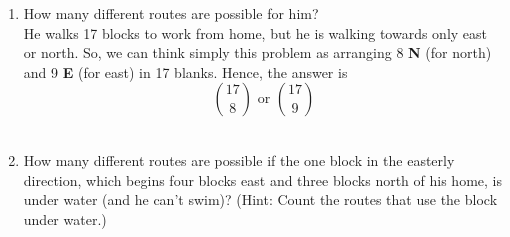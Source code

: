 \documentclass[12pt]{article}
\begin{document}
\begin{itemize}
\begin{center}
    \end{center}
    
    \begin{enumerate}[label=(\alph*)]
        \item How many different routes are possible for him?\\
        
        He walks 17 blocks to work from home, but he is walking towards only east or north. So, we can think simply this problem as arranging 8 {\bf N} (for north) and 9 {\bf E} (for east) in 17 blanks. Hence, the answer is $$\binom{17}{8} \text{ or } \binom{17}{9}$$\\
        
        \item How many different routes are possible if the one block in the easterly direction, which begins four blocks east and three blocks north of his home, is under water (and he can't swim)? (Hint: Count the routes that use the block under water.)
        
        \begin{center}
        
\end{center}
\end{enumerate}
\end{itemize}
\end{document}
